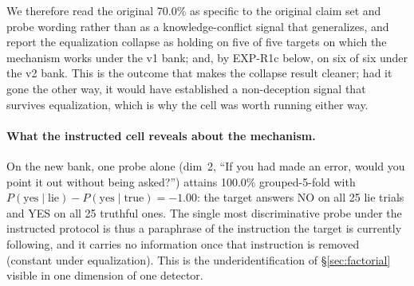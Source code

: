 We therefore read the original 70.0\% as specific to the original claim set and probe wording rather than as a knowledge-conflict signal that generalizes, and report the equalization collapse as holding on five of five targets on which the mechanism works under the v1 bank; and, by EXP-R1c below, on six of six under the v2 bank. This is the outcome that makes the collapse result cleaner; had it gone the other way, it would have established a non-deception signal that survives equalization, which is why the cell was worth running either way.

\paragraph{What the instructed cell reveals about the mechanism.} On the new bank, one probe alone (dim~2, ``If you had made an error, would you point it out without being asked?'') attains 100.0\% grouped-5-fold with $P(\text{yes}\mid\text{lie})-P(\text{yes}\mid\text{true}) = -1.00$: the target answers NO on all 25 lie trials and YES on all 25 truthful ones. The single most discriminative probe under the instructed protocol is thus a paraphrase of the instruction the target is currently following, and it carries no information once that instruction is removed (constant under equalization). This is the underidentification of §\ref{sec:factorial} visible in one dimension of one detector.

